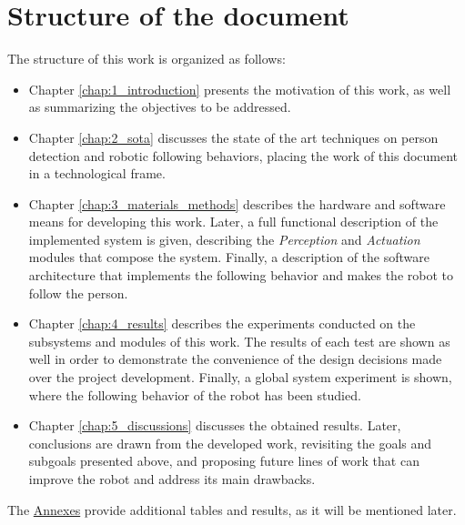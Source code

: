 \section{Structure of the document}
\label{sec:1_structure}
The structure of this work is organized as follows:
\begin{itemize}
	\item Chapter \ref{chap:1_introduction} presents the motivation of this work, as well as summarizing the objectives to be addressed.
	\item Chapter \ref{chap:2_sota} discusses the state of the art techniques on person detection and robotic following behaviors, placing the work of this document in a technological frame.
	\item Chapter \ref{chap:3_materials_methods} describes the hardware and software means for developing this work. Later, a full functional description of the implemented system is given, describing the \textit{Perception} and \textit{Actuation} modules that compose the system. Finally, a description of the software architecture that implements the following behavior and makes the robot to follow the person.
	\item Chapter \ref{chap:4_results} describes the experiments conducted on the subsystems and modules of this work. The results of each test are shown as well in order to demonstrate the convenience of the design decisions made over the project development. Finally, a global system experiment is shown, where the following behavior  of the robot has been studied.
	\item Chapter \ref{chap:5_discussions} discusses the obtained results. Later, conclusions are drawn from the developed work, revisiting the goals and subgoals presented above, and proposing future lines of work that can improve the robot and address its main drawbacks.
\end{itemize}

The \hyperref[chap:6_annexes]{Annexes} provide additional tables and results, as it will be mentioned later.


